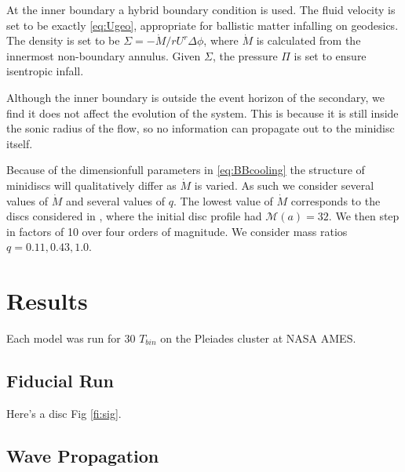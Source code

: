 \documentclass{emulateapj}
\newcommand{\De}{\Delta}
\newcommand{\Sig}{\Sigma}
\begin{document}
At the inner boundary a hybrid boundary condition is used.  The fluid velocity is set to be exactly \eqref{eq:Ugeo}, appropriate for ballistic matter infalling on geodesics.  The density is set to be $\Sig = -\dot{M} / r U^r \De \phi$, where $\dot{M}$ is calculated from the innermost non-boundary annulus.  Given $\Sig$, the pressure $\Pi$ is set to ensure isentropic infall.

Although the inner boundary is outside the event horizon of the secondary, we find it does not affect the evolution of the system.  This is because it is still inside the sonic radius of the flow, so no information can propagate out to the minidisc itself.  

Because of the dimensionfull parameters in \eqref{eq:BBcooling} the structure of minidiscs will qualitatively differ as $\dot{M}$ is varied.  As such we consider several values of $\dot{M}$ and several values of $q$.  The lowest value of $\dot{M}$ corresponds to the discs considered in \cite{Farris14}, where the initial disc profile had $\mathcal{M}(a) = 32$.  We then step in factors of 10 over four orders of magnitude.  We consider mass ratios $q = 0.11, 0.43, 1.0$.


\section{Results}
\label{sec:results}

Each model was run for 30 $T_{bin}$ on the Pleiades cluster at NASA AMES.

\subsection{Fiducial Run}
\label{subsec:fiducial}

Here's a disc Fig \ref{fi:sig}.

\begin{figure*}
\caption{\label{fi:sig} Surface density for fiducial minidisc after 28 orbits.  Magenta dashed lines are level curves of the Roche potential corresponding to the L1 and L2 Lagrange points.}
\end{figure*}

\subsection{Wave Propagation}
\label{subsec:prop}
\end{document}
